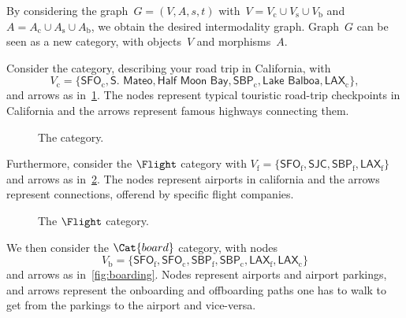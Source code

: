 By considering the graph~$G=(V,A,s,t)$ with~$V=V_\mathrm{c}\cup V_\mathrm{s}\cup V_\mathrm{b}$ and~$A=A_\mathrm{c}\cup A_\mathrm{s}\cup A_\mathrm{b}$, we obtain the desired intermodality graph. Graph~$G$ can be seen as a new category, with objects~$V$ and morphisms~$A$.
\begin{example}
    Consider the \Car category, describing your road trip in California, with
    \begin{equation*}
        V_\mathrm{c}=\{\textsf{SFO}_\mathrm{c},\textsf{S. Mateo},\textsf{Half Moon Bay},\textsf{SBP}_\mathrm{c},\textsf{Lake Balboa},\textsf{LAX}_\mathrm{c}\},
    \end{equation*}
    and arrows as in~\cref{fig:carcat}. The nodes represent typical touristic road-trip checkpoints in California and the arrows represent famous highways connecting them.

    \begin{figure}[h!]
        \begin{center}
        \end{center}
        \caption{The \Car category. }
         \label{fig:carcat}
    \end{figure}

    Furthermore, consider the $\Flight$ category with $V_\mathrm{f}=\{\textsf{SFO}_\mathrm{f}, \textsf{SJC}, \textsf{SBP}_\mathrm{f}, \textsf{LAX}_\mathrm{f}\}$ and arrows as in~\cref{fig:flight}. The nodes represent airports in california and the arrows represent connections, offerend by specific flight companies.

    \begin{figure}[h!]
        \begin{center}
        \end{center}
        \caption{The $\Flight$ category. \label{fig:flight}}
    \end{figure}

    We then consider the $\Cat{board}$ category, with nodes
    \begin{equation*}
        V_\mathrm{b}=\{\textsf{SFO}_\mathrm{f},\textsf{SFO}_\mathrm{c},\textsf{SBP}_\mathrm{f},\textsf{SBP}_\mathrm{c},\textsf{LAX}_\mathrm{f},\textsf{LAX}_\mathrm{c}\}
    \end{equation*}
    and arrows as in~\cref{fig:boarding}. Nodes represent airports and airport parkings, and arrows represent the onboarding and offboarding paths one has to walk to get from the parkings to the airport and vice-versa.


\end{example}
